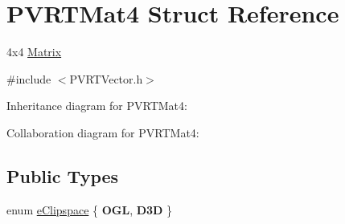 \hypertarget{struct_p_v_r_t_mat4}{\section{P\+V\+R\+T\+Mat4 Struct Reference}
\label{struct_p_v_r_t_mat4}
}


4x4 \hyperlink{class_matrix}{Matrix}  




{\ttfamily \#include $<$P\+V\+R\+T\+Vector.\+h$>$}



Inheritance diagram for P\+V\+R\+T\+Mat4\+:


Collaboration diagram for P\+V\+R\+T\+Mat4\+:
\subsection*{Public Types}
\begin{DoxyCompactItemize}
\item 
enum \hyperlink{struct_p_v_r_t_mat4_aad804cddb0d3f6799550aaa703d71e96}{e\+Clipspace} \{ {\bfseries O\+G\+L}, 
{\bfseries D3\+D}
 \}
\end{DoxyCompactItemize}

